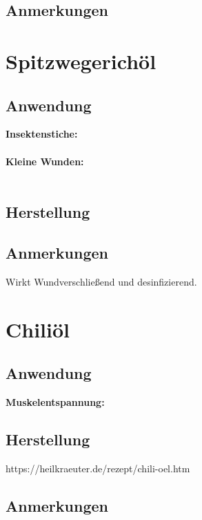 \subsection{Anmerkungen}





\section{Spitzwegerichöl}

\subsection{Anwendung}

\textbf{Insektenstiche:} \\ \\
\textbf{Kleine Wunden:} \\ \\


\cite{swrhandwerkskunst}

\subsection{Herstellung}

\cite{swrhandwerkskunst}

\subsection{Anmerkungen}

Wirkt Wundverschließend und desinfizierend.



\section{Chiliöl}

\subsection{Anwendung}

\textbf{Muskelentspannung:}

\subsection{Herstellung}

https://heilkraeuter.de/rezept/chili-oel.htm

\subsection{Anmerkungen}


